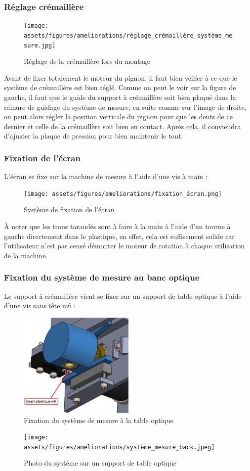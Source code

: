 \subsubsection{Réglage crémaillère}
\begin{figure}[H]
    \centering
    \texttt{[image: assets/figures/ameliorations/réglage\_crémaillère\_système\_mesure.jpg]}
    \caption{Réglage de la crémaillère lors du montage}
\end{figure}
Avant de fixer totalement le moteur du pignon, il faut bien veiller à ce que le système de crémaillère est bien réglé.
Comme on peut le voir sur la figure de gauche, il faut que le guide du support à crémaillère soit bien plaqué dans la rainure
de guidage du système de mesure, en suite comme sur l'image de droite, on peut alors régler la position verticale du pignon
pour que les dents de ce dernier et celle de la crémaillère soit bien en contact. Après cela, il conviendra d'ajuster la plaque de
pression pour bien maintenir le tout.

\subsubsection{Fixation de l'écran}
L'écran se fixe sur la machine de mesure à l'aide d'une vis à main :
\begin{figure}[H]
    \centering
    \texttt{[image: assets/figures/ameliorations/fixation\_écran.png]}
    \caption{Système de fixation de l'écran}
\end{figure}
À noter que les trous taraudés sont à faire à la main à l'aide d'un tourne à gauche directement dans le plastique, en effet,
cela est suffisement solide car l'utilisateur n'est pas censé démonter le moteur de rotation à chaque utilisation de la machine.

\subsubsection{Fixation du système de mesure au banc optique}
Le support à crémaillère vient se fixer sur un support de table optique à l'aide d'une vis sans tête m6 :
\begin{figure}[H]
    \centering
    \includegraphics[width = 0.5\textwidth]{assets/figures/ameliorations/fixation_table_optique.jpg}
    \caption{Fixation du système de mesure à la table optique}
\end{figure}
\begin{figure}[H]
    \centering
    \texttt{[image: assets/figures/ameliorations/système\_mesure\_back.jpeg]}
    \caption{Photo du système sur un support de table optique}
\end{figure}

